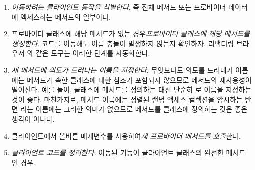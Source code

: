 \documentclass[a4paper,10pt,twoside]{book}
\begin{document}
\begin{enumerate}
\item \emph{이동하려는 클라이언트 동작을 식별한다}, 즉 전체 메서드 또는 프로바이더 데이터에 액세스하는 메서드의 일부이다.


\item 프로바이더 클래스에 해당 메서드가 없는 경우\emph{프로바이더 클래스에 해당 메서드를 생성한다}. 코드를 이동해도 이름 충돌이 발생하지 않는지 확인하자. 리팩터링 브라우저 \cite{Robe97a}와 같은 도구는 이러한 단계를 자동화한다.


\item \emph{새 메서드에 의도가 드러나는 이름을 지정한다.} 무엇보다도 의도를 드러내기 이름에는 메서드가 속한 클래스에 대한 참조가 포함되지 않으므로 메서드의 재사용성이 떨어진다. 예를 들어,  클래스에  메서드를 정의하는 대신 단순히 로 이름을 지정하는 것이 좋다. 마찬가지로, 메서드 이름에는 정렬된 랜덤 액세스 컬렉션을 암시하는 반면 라는 이름에는 그러한 의미가 없으므로  메서드를  클래스에 정의하는 것은 좋은 생각이 아니다.

\item 클라이언트에서 올바른 매개변수를 사용하여\emph{새 프로바이더 메서드를 호출}한다.

\item \emph{클라이언트 코드를 정리한다.} 이동된 기능이 클라이언트 클래스의 완전한 메서드인 경우.


\end{enumerate}
\end{document}
